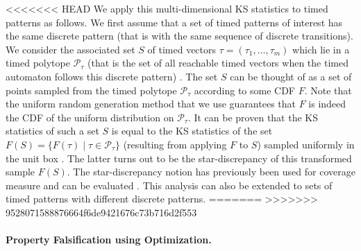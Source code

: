 <<<<<<< HEAD
We apply this multi-dimensional KS statistics to timed patterns as follows. We first assume that a set of timed patterns of interest has the same discrete pattern (that is with the same sequence of discrete transitions). We consider the associated set $S$ of timed vectors $\tau = (\tau_1, \ldots, \tau_m)$ which lie in a timed polytope $\mathcal{P}_{\tau}$ (that is the set of all reachable timed vectors when the timed automaton follows this discrete pattern) \cite{BBBK16}. The set $S$ can be thought of as a set of points sampled from the timed polytope $\mathcal{P}_{\tau}$ according to some CDF $F$. Note that the uniform random generation method  \cite{BBBK16}  that we use guarantees that $F$ is indeed the CDF of the uniform distribution on $\mathcal{P}_{\tau}$. It can be proven that the KS statistics of such a set $S$ is equal to the KS statistics of the set $F(S)=\{F(\tau)\mid  \tau \in \mathcal{P}_{\tau}\}$ (resulting from applying $F$ to $S$) sampled uniformly in the unit box \cite{rosenblatt1952}. The latter turns out to be the star-discrepancy of this transformed sample $F(S)$. The star-discrepancy notion has previously been used for coverage measure and can be evaluated \cite{DangN09}. This analysis can also be extended to sets of timed patterns with different discrete patterns.
=======
>>>>>>> 9528071588876664f6de9421676c73b716d2f553





\paragraph{Property Falsification using Optimization.}	

